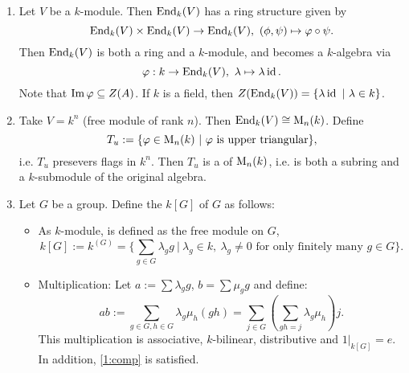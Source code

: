 \begin{bsp}
	\begin{enumerate}
		\item Let $V$ be a $k$-module. Then $\operatorname{End}_k(V)$ has a ring structure given by
		\[
		\operatorname{End}_k(V)\times \operatorname{End}_k(V)\to \operatorname{End}_k(V),~(\phi,\psi)\mapsto \varphi\circ \psi.
		\]
		Then $\operatorname{End}_k(V)$ is both a ring and a $k$-module, and becomes a $k$-algebra via
		\[
		\varphi: k\to \operatorname{End}_k(V),~\lambda \mapsto \lambda \operatorname{id}.
		\]
		Note that $\operatorname{Im} \varphi \subseteq Z(A)$. If $k$ is a field, then $Z(\operatorname{End}_k(V))=\{\lambda \operatorname{id} ~|~\lambda \in k\}$.
		\item Take $V=k^n$ (free module of rank $n$). Then $\operatorname{End}_k(V)\cong \operatorname{M}_n(k)$. Define
		\[
		T_u:=\{ \varphi \in \operatorname{M}_n(k)~|~\varphi \text{ is upper triangular}\},
		\]
		i.e. $T_u$ presevers flags in $k^n$. Then $T_u$ is a  of $\operatorname{M}_n(k)$, i.e. is both a subring and a $k$-submodule of the original algebra.
		\item Let $G$ be a group. Define the  $k[G]$ of $G$ as follows:
		\begin{itemize}
			\item As $k$-module, is defined as the free module on $G$,
			\[
			k[G]:= k^{(G)} = \{ \sum_{g\in G}\lambda_{g}g~|~\lambda_g\in k,~\lambda_g\neq 0\text{ for only finitely many }g\in G\}.
			\]
			\item Multiplication: Let $a:= \sum \lambda_g g$, $b=\sum \mu_g g$ and define:
			\[
			ab:= \sum_{g\in G,h\in G}\lambda_g\mu_h(gh) = \sum_{j\in G}\left(\sum_{gh=j}\lambda_g\mu_h\right)j.\]
			This multiplication is associative, $k$-bilinear, distributive and $\left.1\right|_{k[G]}=e$. In addition, \eqref{1:comp} is satisfied.
	\end{itemize}
\end{enumerate}
\end{bsp}
